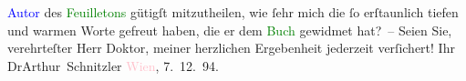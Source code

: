                   \textcolor{blue}{Autor}{} des \textcolor{green}{Feuilletons}{} gütigſt mitzutheilen, wie ſehr
               mich {\pb}die ſo erſtaunlich tiefen und warmen Worte
               gefreut haben, die er dem \textcolor{green}{Buch}{}
               gewidmet hat? –\pend
           \pstart
           Seien Sie, verehrteſter Herr Doktor, meiner herzlichen Ergebenheit jederzeit
               verſichert!\pend
           \pstart Ihr \spacefill\mbox{DrArthur Schnitzler}\pend{}\pstart
           \textcolor{pink}{Wien}{}\ledrightnote{\textcolor{pink}{Wien}}, 7. 12. 94.\pend
           \endnumbering{}  
      